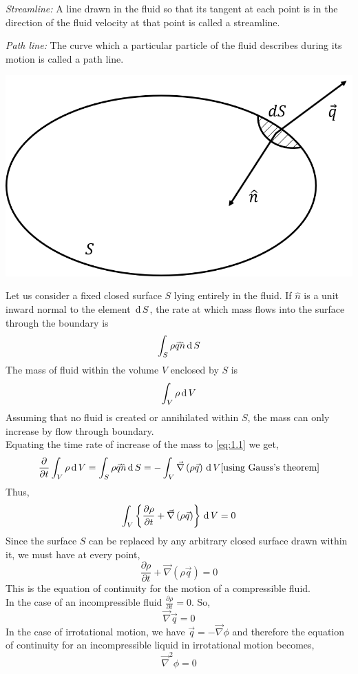 \documentclass[12pt]{article}
\begin{document}
\begin{soln}
    \emph{Streamline:} A line drawn in the fluid so that its tangent at each point is in the direction of the fluid velocity at that point is called a streamline.

    
    \emph{Path line:} The curve which a particular particle of the fluid describes during its motion is called a path line.

    \begin{center}
        \includegraphics[scale=.75]{img/ass-1-1.1.png}
    \end{center}
    Let us consider a fixed closed surface $ S $ lying entirely in the fluid. If $ \hat{n} $ is a unit inward normal to the element $ \,\mathrm{d}\, S $, the rate at which mass flows into the surface through the boundary is 
    \begin{equation}
        \int_S \rho \vec{q}\hat{n}\,\mathrm{d}\, S \label{eq:1.1}
    \end{equation}
    The mass of fluid within the volume $ V $ enclosed by $ S $ is
    \begin{equation}
        \int_V \rho\,\mathrm{d}\, V\label{eq:1.2}
    \end{equation}
    Assuming that no fluid is created or annihilated within $ S $, the mass can only increase by flow through boundary.\\
    Equating the time rate of increase of the mass to \eqref{eq:1.1} we get,
    \[
        \frac{\partial}{\partial t}\int_V \rho\,\mathrm{d}\, V=\int_S \rho \vec{q}\hat{n}\,\mathrm{d}\, S=-\int_V \vec{\nabla}\left( \rho \vec{q} \right)\,\mathrm{d}\, V \text{[using Gauss's theorem]}
    \]
    Thus,
    \[
        \int_V\left\{ \frac{\partial \rho}{\partial t}+\vec{\nabla}\left( \rho \vec{q} \right)\right\}\,\mathrm{d}\, V =0
    \]
    Since the surface $ S $ can be replaced by any arbitrary closed surface drawn within it, we must have at every point,
    \[
        \frac{\partial \rho}{\partial t}+\vec{\nabla}\left( \rho \vec{q} \right)=0
    \]
    This is the equation of continuity for the motion of a compressible fluid.\\
    In the case of an incompressible fluid $ \frac{\partial \rho}{\partial t}=0 $. So,
    \[
        \vec{\nabla}\vec{q}=0
    \]
    In the case of irrotational motion, we have $ \vec{q}=-\vec{\nabla}\phi $ and therefore the equation of continuity for an incompressible liquid in irrotational motion becomes,
    \[
        \vec{\nabla}^2 \phi=0
    \]
\end{soln}
\end{document}
